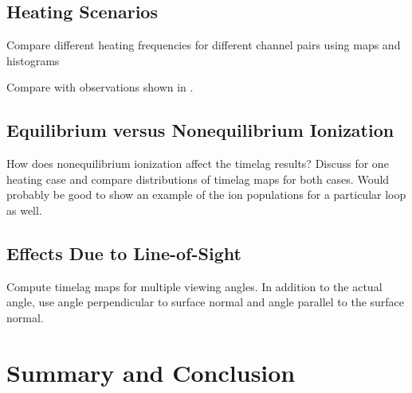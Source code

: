 \documentclass[modern,linenumbers]{aastex62}
\begin{document}
\subsection{Heating Scenarios}
Compare different heating frequencies for different channel pairs using maps and histograms

Compare with observations shown in \citet{viall_survey_2017}.

\subsection{Equilibrium versus Nonequilibrium Ionization}
How does nonequilibrium ionization affect the timelag results? Discuss for one heating case and compare distributions of timelag maps for both cases. Would probably be good to show an example of the ion populations for a particular loop as well.

\subsection{Effects Due to Line-of-Sight}
Compute timelag maps for multiple viewing angles. In addition to the actual angle, use angle perpendicular to surface normal and angle parallel to the surface normal.

\section{Summary and Conclusion}
\label{conclusions}

\acknowledgments





\end{document}
